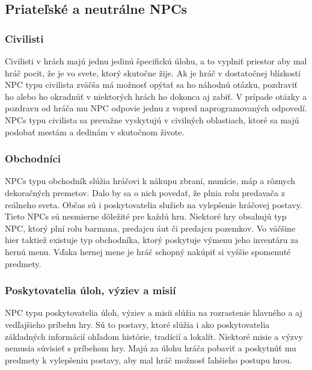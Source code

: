 \documentclass[10pt,twoside,slovak,a4paper]{article}
\begin{document}
\subsection{Priateľské a neutrálne NPCs}  \label{Ally & non}  

\subsubsection{Civilisti} 
Civilisti v hrách majú jednu jedinú špecifickú úlohu, a to vyplniť priestor aby mal hráč pocit, že je vo svete, ktorý skutočne žije. Ak je hráč v dostatočnej blízkosti NPC typu civilista zväčša má možnosť opýtať sa ho náhodnú otázku, pozdraviť ho alebo ho okradnúť v niektorých hrách ho dokonca aj zabiť. V prípade otázky a pozdravu od hráča mu NPC odpovie jednu z vopred naprogramovaných odpovedí. NPCs typu civilista sa prevažne vyskytujú v civilných oblastiach, ktoré sa majú podobať mestám a dedinám v skutočnom živote.  


\subsubsection{Obchodníci}
NPCs typu obchodník slúžia hráčovi k nákupu zbraní, munície, máp a rôznych dekoračných premetov. Dalo by sa o nich povedať, že plnia rolu predavača z reálneho sveta. Občas sú i poskytovatelia služieb na vylepšenie hráčovej postavy. Tieto NPCs sú nesmierne dôležité pre každú hru. Niektoré hry obsahujú typ NPC, ktorý plní rolu barmana, predajcu áut či predajcu pozemkov. Vo väčšine hier taktiež existuje typ obchodníka, ktorý poskytuje výmenu jeho inventáru za hernú menu. Vďaka hernej mene je hráč schopný nakúpiť si vyššie spomenuté predmety.  


\subsubsection{Poskytovatelia úloh, výziev a misií}
NPC typu poskytovatelia úloh, výziev a misii slúžia na rozrastenie hlavného a aj vedľajšieho príbehu hry. Sú to postavy, ktoré slúžia i ako poskytovatelia základných informácií ohľadom histórie, tradícií a lokalít. Niektoré misie a výzvy nemusia súvisieť s príbehom hry. Majú za úlohu hráča pobaviť a poskytnúť mu predmety k vylepšeniu postavy, aby mal hráč možnosť ľahšieho postupu hrou. 
\end{document}
